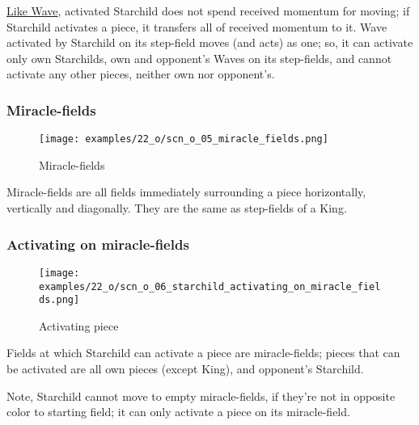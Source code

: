 \hyperref[fig:10_wave]{Like Wave}, activated Starchild does not spend received
momentum for moving; if Starchild activates a piece, it transfers all of received
momentum to it. Wave activated by Starchild on its step-field moves (and acts) as
one; so, it can activate only own Starchilds, own and opponent's Waves on its
step-fields, and cannot activate any other pieces, neither own nor opponent's.

\clearpage %

\subsubsection*{Miracle-fields}
\label{sec:One/Starchild/Movement/Miracle-fields}

\noindent
\begin{wrapfigure}[5]{l}{0.4\textwidth}
\centering
\texttt{[image: examples/22\_o/scn\_o\_05\_miracle\_fields.png]}
\caption{Miracle-fields}
\label{fig:scn_o_05_miracle_fields}
\end{wrapfigure}
Miracle-fields are all fields immediately surrounding a piece horizontally,
vertically and diagonally. They are the same as step-fields of a King.

\vspace*{2.1\baselineskip}
\subsubsection*{Activating on miracle-fields}
\label{sec:One/Starchild/Movement/Activating on miracle-fields}

\noindent
\begin{wrapfigure}[8]{l}{0.4\textwidth}
\centering
\texttt{[image: examples/22\_o/scn\_o\_06\_starchild\_activating\_on\_miracle\_fields.png]}
\caption{Activating piece}
\label{fig:scn_o_06_starchild_activating_on_miracle_fields}
\end{wrapfigure}
Fields at which Starchild can activate a piece are miracle-fields; pieces that
can be activated are all own pieces (except King), and opponent's Starchild.

Note, Starchild cannot move to empty miracle-fields, if they're not in opposite
color to starting field; it can only activate a piece on its miracle-field.

